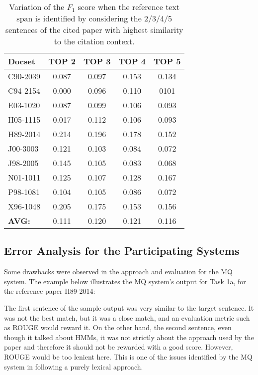 \documentclass[11pt]{article}
\begin{document}
\begin{table}[h]\footnotesize
  \begin{center}
  \begin{tabular}{ | l | c | c | c | c | }
    \hline
    Docset & TOP 2 & TOP 3 & TOP 4 & TOP 5 \\ \hline
    C90-2039 & 0.087 & 0.097 & 0.153 & 0.134 \\ \hline
    C94-2154 & 0.000 & 0.096 & 0.110 & 0101 \\ \hline
    E03-1020 & 0.087 & 0.099 & 0.106 & 0.093 \\ \hline
    H05-1115 & 0.017 & 0.112 & 0.106 & 0.093 \\ \hline
    H89-2014 & 0.214 & 0.196 & 0.178 & 0.152 \\ \hline
    J00-3003 & 0.121 & 0.103 & 0.084 & 0.072 \\ \hline
    J98-2005 & 0.145 & 0.105 & 0.083 & 0.068 \\ \hline
    N01-1011 & 0.125 & 0.107 & 0.128 & 0.167 \\ \hline
    P98-1081 & 0.104 & 0.105 & 0.086 & 0.072 \\ \hline
    X96-1048 & 0.205 & 0.175 & 0.153 & 0.156 \\ \hline
    \textbf{AVG:}  & 0.111 & 0.120 & 0.121 & 0.116 \\ \hline
  \end{tabular}
  \caption{Variation of the $F_1$ score when the reference text span is identified by 
  considering the 2/3/4/5 sentences of the cited paper with highest similarity to
  the citation context.}
  \label{table:task1aEval}
  \end{center}
\end{table}


\subsection{Error Analysis for the Participating Systems}

Some drawbacks were observed in the approach and evaluation for the MQ system. The example below illustrates the MQ system's output for Task 1a, for the reference paper H89-2014:

\noindent{}
The first sentence of the sample output was very similar to the target sentence. It was not the best match, but it was a close match, and an evaluation metric such as ROUGE would reward it. On the other hand, the second sentence, even though it talked about HMMs, it was not strictly about the approach used by the paper and therefore it should not be rewarded with a good score. However, ROUGE would be too lenient here. This is one of the issues identified by the MQ system in following a purely lexical approach.
\end{document}
